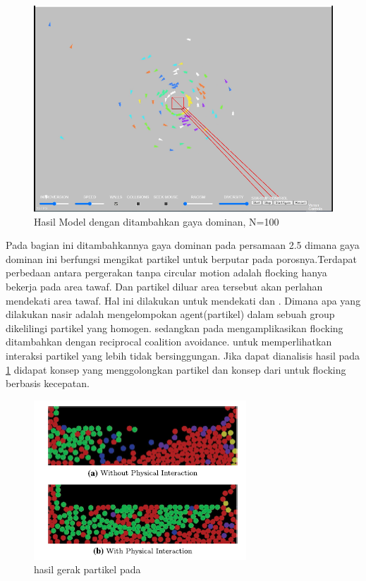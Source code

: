 \begin{figure}
\centering
\includegraphics[scale=0.6]{gambar/gambar3tawafflocking25}
\caption{Hasil Model dengan ditambahkan gaya dominan, N=100}
\label{fig:2grafikmodel4gayadengan dominanforce}
\end{figure}
\hspace{0.6cm} Pada bagian ini ditambahkannya gaya dominan pada persamaan 2.5 dimana gaya dominan ini berfungsi mengikat partikel untuk berputar pada porosnya.Terdapat perbedaan antara pergerakan tanpa circular motion adalah flocking hanya bekerja pada area tawaf. Dan partikel diluar area tersebut akan perlahan mendekati area tawaf. Hal ini dilakukan untuk mendekati \citep{Nasir2016} dan \citep{Kim2014}. Dimana apa yang dilakukan nasir adalah mengelompokan agent(partikel) dalam sebuah group dikelilingi partikel yang homogen. sedangkan pada \citep{Kim2014} mengamplikasikan flocking ditambahkan dengan reciprocal coalition avoidance. untuk memperlihatkan interaksi partikel yang lebih tidak bersinggungan. Jika dapat dianalisis hasil pada \ref{fig:2grafikmodel4gayadengan dominanforce} didapat konsep \citep{Nasir2016} yang menggolongkan partikel dan konsep dari \citep{Kim2014} untuk flocking berbasis kecepatan.
\begin{figure}{}
\centering
\includegraphics[scale=0.6]{gambar/Kim2014}
\caption{hasil gerak partikel pada \citep{Kim2014}}
\label{fig:figkim2014}
\end{figure}
